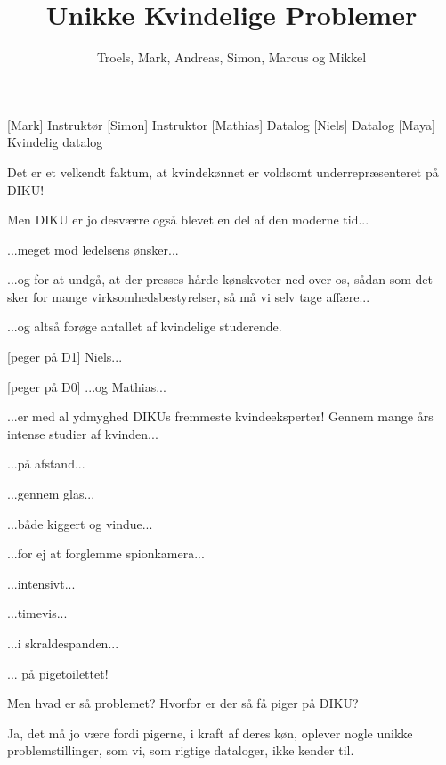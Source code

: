 \documentclass[a4paper,11pt]{article}
\title{Unikke Kvindelige Problemer}
\author{Troels, Mark, Andreas, Simon, Marcus og Mikkel}
\begin{document}
\maketitle

\begin{roles}
    [Mark] Instruktør
    [Simon] Instruktor
    [Mathias] Datalog
    [Niels] Datalog
    [Maya] Kvindelig datalog
\end{roles}

\begin{sketch}
   Det er et velkendt faktum, at kvindekønnet er voldsomt
  underrepræsenteret på DIKU!

   Men DIKU er jo desværre også blevet en del af den moderne
  tid...

   ...meget mod ledelsens ønsker...

   ...og for at undgå, at der presses hårde kønskvoter ned
  over os, sådan som det sker for mange virksomhedsbestyrelser, så må
  vi selv tage affære...

   ...og altså forøge antallet af kvindelige studerende.

  [peger på D1] Niels...

  [peger på D0] ...og Mathias...


   ...er med al ydmyghed DIKUs fremmeste kvindeeksperter!
  Gennem mange års intense studier af kvinden...

   ...på afstand...

   ...gennem glas...

   ...både kiggert og vindue...

   ...for ej at forglemme spionkamera...

   ...intensivt...

   ...timevis...

   ...i skraldespanden...

   ... på pigetoilettet!


   Men hvad er så problemet?  Hvorfor er der så få piger på
  DIKU?

   Ja, det må jo være fordi pigerne, i kraft af deres køn,
  oplever nogle unikke problemstillinger, som vi, som rigtige
  dataloger, ikke kender til.


\end{sketch}
\end{document}
